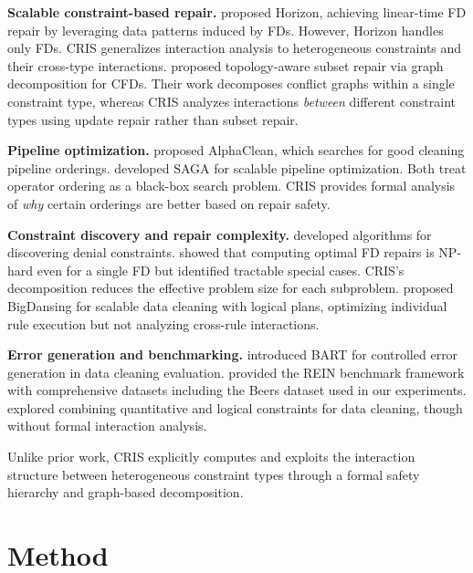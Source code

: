 \documentclass{article}
\newcommand{\cris}{\textsc{CRIS}\xspace}
\begin{document}
\textbf{Scalable constraint-based repair.}
\citet{rezig2021horizon} proposed Horizon, achieving linear-time FD repair by leveraging data patterns induced by FDs. However, Horizon handles only FDs. \cris generalizes interaction analysis to heterogeneous constraints and their cross-type interactions.
\citet{zhao2026topology} proposed topology-aware subset repair via graph decomposition for CFDs. Their work decomposes conflict graphs within a single constraint type, whereas \cris analyzes interactions \emph{between} different constraint types using update repair rather than subset repair.

\textbf{Pipeline optimization.}
\citet{krishnan2019alphaclean} proposed AlphaClean, which searches for good cleaning pipeline orderings. \citet{siddiqi2024saga} developed SAGA for scalable pipeline optimization. Both treat operator ordering as a black-box search problem. \cris provides formal analysis of \emph{why} certain orderings are better based on repair safety.

\textbf{Constraint discovery and repair complexity.}
\citet{chu2013discovering} developed algorithms for discovering denial constraints. \citet{livshits2020computing} showed that computing optimal FD repairs is NP-hard even for a single FD but identified tractable special cases. \cris{}'s decomposition reduces the effective problem size for each subproblem.
\citet{khayyat2015bigdansing} proposed BigDansing for scalable data cleaning with logical plans, optimizing individual rule execution but not analyzing cross-rule interactions.

\textbf{Error generation and benchmarking.}
\citet{arocena2015bart} introduced BART for controlled error generation in data cleaning evaluation. \citet{abdelaal2023rein} provided the REIN benchmark framework with comprehensive datasets including the Beers dataset used in our experiments.
\citet{prokoshyna2015combining} explored combining quantitative and logical constraints for data cleaning, though without formal interaction analysis.

Unlike prior work, \cris explicitly computes and exploits the interaction structure between heterogeneous constraint types through a formal safety hierarchy and graph-based decomposition.


\section{Method}
\label{sec:method}
\end{document}
